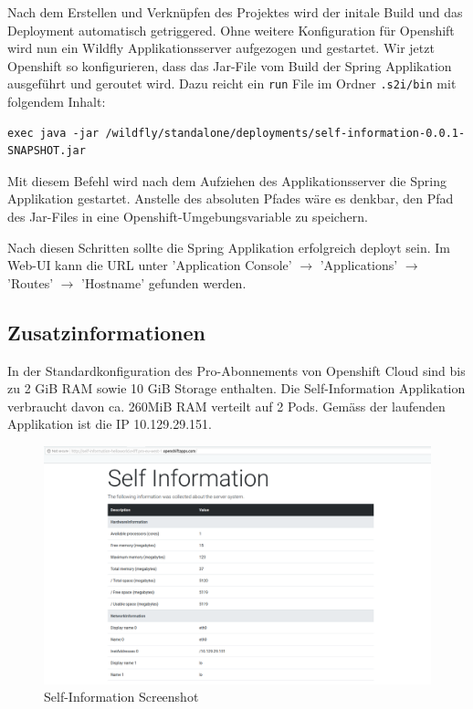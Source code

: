 \documentclass[12pt,a4paper]{article}
\begin{document}
Nach dem Erstellen und Verknüpfen des Projektes wird der initale Build und das Deployment automatisch getriggered. Ohne weitere Konfiguration für Openshift wird nun ein Wildfly Applikationsserver aufgezogen und gestartet. Wir jetzt Openshift so konfigurieren, dass das Jar-File vom Build der Spring Applikation ausgeführt und geroutet wird. Dazu reicht ein \texttt{run} File im Ordner \texttt{.s2i/bin} mit folgendem Inhalt:
\begin{lstlisting}[breaklines=true]
exec java -jar /wildfly/standalone/deployments/self-information-0.0.1-SNAPSHOT.jar
\end{lstlisting}
Mit diesem Befehl wird nach dem Aufziehen des Applikationsserver die Spring Applikation gestartet. Anstelle des absoluten Pfades wäre es denkbar, den Pfad des Jar-Files in eine Openshift-Umgebungsvariable zu speichern. 

Nach diesen Schritten sollte die Spring Applikation erfolgreich deployt sein. Im Web-UI kann die URL unter 'Application Console' $\rightarrow$ 'Applications' $\rightarrow$ 'Routes' $\rightarrow$ 'Hostname' gefunden werden. 

\subsection{Zusatzinformationen}
In der Standardkonfiguration des Pro-Abonnements von Openshift Cloud sind bis zu 2 GiB RAM sowie 10 GiB Storage enthalten. Die Self-Information Applikation verbraucht davon ca. 260MiB RAM verteilt auf 2 Pods. Gemäss der laufenden Applikation ist die IP 10.129.29.151.

\begin{figure}[h]
	\centering
	\includegraphics[width=1\linewidth]{img/self-information}
	\caption{Self-Information Screenshot}
	\label{fig:self-information}
\end{figure}
\end{document}
